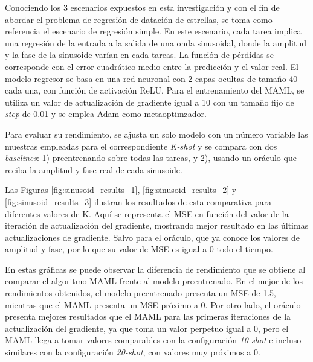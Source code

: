 Conociendo los 3 escenarios expuestos en esta investigación y con el fin de abordar el problema de regresión de datación de estrellas, se toma como referencia el escenario de regresión simple. En este escenario, cada tarea implica una regresión de la entrada a la salida de una onda sinusoidal, donde la amplitud y la fase de la sinusoide varían en cada tareas. La función de pérdidas se corresponde con el error cuadrático medio entre la predicción y el valor real. El modelo regresor se basa en una red neuronal con 2 capas ocultas de tamaño 40 cada una, con función de activación ReLU. Para el entrenamiento del MAML, se utiliza un valor de actualización de gradiente igual a 10 con un tamaño fijo de \emph{step} de 0.01 y se emplea Adam como metaoptimzador.

Para evaluar su rendimiento, se ajusta un solo modelo con un número variable las muestras empleadas para el correspondiente \emph{K-shot} y se compara con dos \emph{baselines}: 1) preentrenando sobre todas las tareas, y 2), usando un oráculo que reciba la amplitud y fase real de cada sinusoide.

Las Figuras \ref{fig:sinusoid_results_1}, \ref{fig:sinusoid_results_2} y \ref{fig:sinusoid_results_3} ilustran los resultados de esta comparativa para diferentes valores de K. Aquí se representa el MSE en función del valor de la iteración de actualización del gradiente, mostrando mejor resultado en las últimas actualizaciones de gradiente. Salvo para el oráculo, que ya conoce los valores de amplitud y fase, por lo que su valor de MSE es igual a 0 todo el tiempo.

En estas gráficas se puede observar la diferencia de rendimiento que se obtiene al comparar el algoritmo MAML frente al modelo preentrenado. En el mejor de los rendimientos obtenidos, el modelo preentrenado presenta un MSE de 1.5, mientras que el MAML presenta un MSE próximo a 0. Por otro lado, el oráculo presenta mejores resultados que el MAML para las primeras iteraciones de la actualización del gradiente, ya que toma un valor perpetuo igual a 0, pero el MAML llega a tomar valores comparables con la configuración \emph{10-shot} e incluso similares con la configuración \emph{20-shot}, con valores muy próximos a 0.

